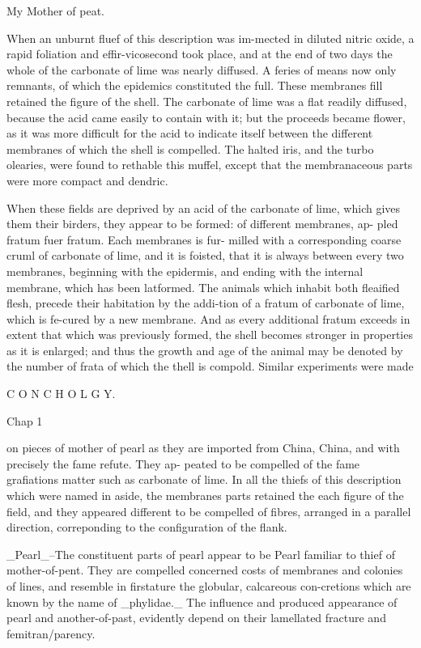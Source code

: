 \documentclass{article}
\begin{document}
My Mother of peat.

When an unburnt fluef of this description was im-mected in diluted nitric oxide, a rapid foliation and effir-vicosecond took place, and at the end of two days the whole of the carbonate of lime was nearly diffused. A feries of means now only remnants, of which the epidemics constituted the full. These membranes fill retained the figure of the shell. The carbonate of lime was a flat readily diffused, because the acid came easily to contain with it; but the proceeds became flower, as it was more difficult for the acid to indicate itself between the different membranes of which the shell is compelled. The halted iris, and the turbo olearies, were found to rethable this muffel, except that the membranaceous parts were more compact and dendric.

When these fields are deprived by an acid of the carbonate of lime, which gives them their birders, they appear to be formed: of different membranes, ap- pled fratum fuer fratum. Each membranes is fur- milled with a corresponding coarse cruml of carbonate of lime, and it is foisted, that it is always between every two membranes, beginning with the epidermis, and ending with the internal membrane, which has been latformed. The animals which inhabit both fleaified flesh, precede their habitation by the addi-tion of a fratum of carbonate of lime, which is fe-cured by a new membrane. And as every additional fratum exceeds in extent that which was previously formed, the shell becomes stronger in properties as it is enlarged; and thus the growth and age of the animal may be denoted by the number of frata of which the thell is compold. Similar experiments were made

C O N C H O L G Y.

Chap 1

on pieces of mother of pearl as they are imported from China, China, and with precisely the fame refute. They ap- peated to be compelled of the fame grafiations matter such as carbonate of lime. In all the thiefs of this description which were named in aside, the membranes parts retained the each figure of the field, and they appeared different to be compelled of fibres, arranged in a parallel direction, correponding to the configuration of the flank.

\_Pearl\_--The constituent parts of pearl appear to be Pearl familiar to thief of mother-of-pent. They are compelled concerned costs of membranes and colonies of lines, and resemble in firstature the globular, calcareous con-cretions which are known by the name of \_phylidae.\_ The influence and produced appearance of pearl and another-of-past, evidently depend on their lamellated fracture and femitran/parency.
\end{document}
